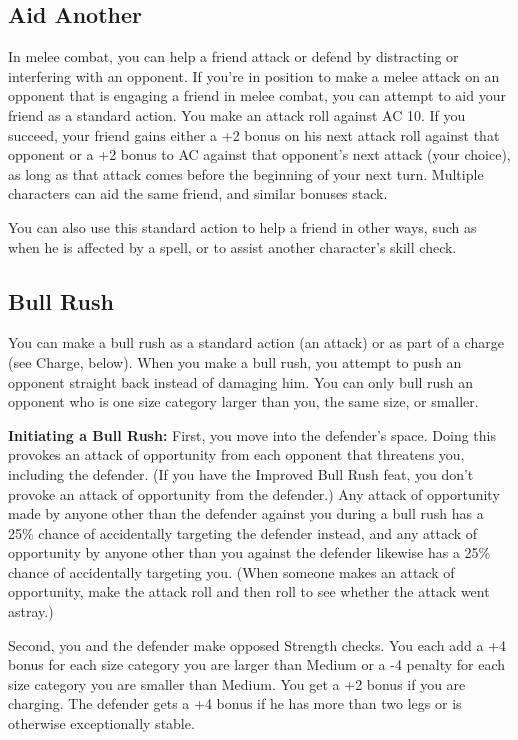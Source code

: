 \subsection{Aid Another}

In melee combat, you can help a friend attack or defend by distracting or interfering 
with an opponent. If you're in position to make a melee attack on an opponent that 
is engaging a friend in melee combat, you can attempt to aid your friend as a standard 
action. You make an attack roll against AC 10. If you succeed, your friend gains 
either a +2 bonus on his next attack roll against that opponent or a +2 bonus to 
AC against that opponent's next attack (your choice), as long as that attack comes 
before the beginning of your next turn. Multiple characters can aid the same friend, 
and similar bonuses stack.

You can also use this standard action to help a friend in other ways, such as when 
he is affected by a spell, or to assist another character's skill check.

\subsection{Bull Rush}

You can make a bull rush as a standard action (an attack) or as part of a charge 
(see Charge, below). When you make a bull rush, you attempt to push an opponent 
straight back instead of damaging him. You can only bull rush an opponent who is 
one size category larger than you, the same size, or smaller.

\textbf{Initiating a Bull Rush:} First, you move into the defender's space. Doing 
this provokes an attack of opportunity from each opponent that threatens you, including 
the defender. (If you have the Improved Bull Rush feat, you don't provoke an attack 
of opportunity from the defender.) Any attack of opportunity made by anyone other 
than the defender against you during a bull rush has a 25\% chance of accidentally 
targeting the defender instead, and any attack of opportunity by anyone other than 
you against the defender likewise has a 25\% chance of accidentally targeting you. 
(When someone makes an attack of opportunity, make the attack roll and then roll 
to see whether the attack went astray.) 

Second, you and the defender make opposed Strength checks. You each add a +4 bonus 
for each size category you are larger than Medium or a -4 penalty for each size 
category you are smaller than Medium. You get a +2 bonus if you are charging. The 
defender gets a +4 bonus if he has more than two legs or is otherwise exceptionally 
stable.

